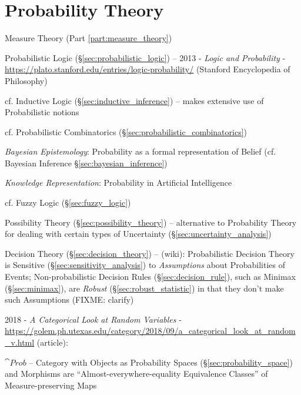 \part{Probability Theory}\label{part:probability_theory}

\fist Measure Theory (Part \ref{part:measure_theory})

\fist Probabilistic Logic (\S\ref{sec:probabilistic_logic}) --
2013 - \emph{Logic and Probability} -
\url{https://plato.stanford.edu/entries/logic-probability/} (Stanford
Encyclopedia of Philosophy)

\fist cf. Inductive Logic (\S\ref{sec:inductive_inference}) -- makes extensive
use of Probabilistic notions

cf. Probabilistic Combinatorics (\S\ref{sec:probabilistic_combinatorics})

\emph{Bayesian Epistemology}: Probability as a formal representation of Belief
(cf. Bayesian Inference \S\ref{sec:bayesian_inference})

\emph{Knowledge Representation}: Probability in Artificial Intelligence

\fist cf. Fuzzy Logic (\S\ref{sec:fuzzy_logic})

\fist Possibility Theory (\S\ref{sec:possibility_theory}) -- alternative to
Probability Theory for dealing with certain types of Uncertainty
(\S\ref{sec:uncertainty_analysis})

\fist Decision Theory (\S\ref{sec:decision_theory}) --
(wiki): Probabilistic Decision Theory is Sensitive
(\S\ref{sec:sensitivity_analysis}) to \emph{Assumptions} about Probabilities of
Events; Non-probabilistic Decision Rules (\S\ref{sec:decision_rule}), such as
Minimax (\S\ref{sec:minimax}), are \emph{Robust} (\S\ref{sec:robust_statistic})
in that they don't make such Assumptions (FIXME: clarify)

2018 - \emph{A Categorical Look at Random Variables} -
\url{https://golem.ph.utexas.edu/category/2018/09/a_categorical_look_at_random_v.html}
(article):

$\cat{Prob}$ -- Category with Objects as Probability Spaces
(\S\ref{sec:probability_space}) and Morphisms are ``Almost-everywhere-equality
Equivalence Classes'' of Measure-preserving Maps


